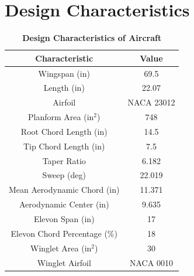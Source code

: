 \section{Design Characteristics}

    \begin{table}[H]
    \begin{center}
    \caption{\textbf{Design Characteristics of Aircraft}} \label{table:design_char}
    \begin{tabular}{|c|c|} 
        \hline
        \textbf{Characteristic} & \textbf{Value} \\ \hline
        Wingspan (in) & 69.5 \\ \hline
        Length (in) & 22.07 \\ \hline
        Airfoil & NACA 23012 \\ \hline
        Planform Area (in$^2$) & 748 \\ \hline
        Root Chord Length (in) & 14.5 \\ \hline
        Tip Chord Length (in) & 7.5 \\ \hline
        Taper Ratio & 6.182 \\ \hline
        Sweep (deg) & 22.019 \\ \hline
        Mean Aerodynamic Chord (in) &  11.371 \\ \hline
        Aerodynamic Center (in) & 9.635 \\ \hline
        Elevon Span (in) & 17 \\ \hline
        Elevon Chord Percentage (\%) & 18 \\ \hline
        Winglet Area (in$^2$) & 30 \\ \hline
        Winglet Airfoil & NACA 0010 \\
        \hline
    \end{tabular}
    \end{center}
    \end{table}

